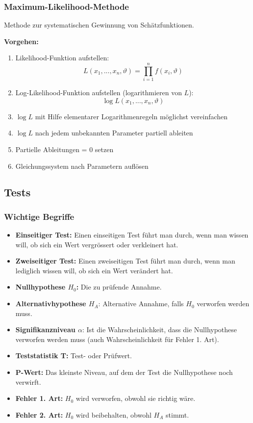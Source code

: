 \subsubsection{Maximum-Likelihood-Methode}
Methode zur systematischen Gewinnung von Schätzfunktionen.

\vspace{10pt}

\textbf{Vorgehen:}
\begin{enumerate}
	\item Likelihood-Funktion aufstellen:
	\[
	L(x_1,...,x_n,\vartheta)= \prod \limits_{i=1}^{n} f(x_i,\vartheta)
	\]
	\item Log-Likelihood-Funktion aufstellen (logarithmieren von $L$):
	\[
	\log L(x_1,...,x_n,\vartheta)
	\]
	\item $\log L$ mit Hilfe elementarer Logarithmenregeln möglichst vereinfachen
	\item $\log L$ nach jedem unbekannten Parameter partiell ableiten
	\item Partielle Ableitungen = 0 setzen
	\item Gleichungssystem nach Parametern auflösen
\end{enumerate}

\subsection{Tests}

\subsubsection{Wichtige Begriffe}

\begin{itemize}
	\item \textbf{Einseitiger Test:} Einen einseitigen Test führt man durch, wenn man wissen will, ob sich ein Wert vergrössert oder verkleinert hat.
	\item \textbf{Zweiseitiger Test:} Einen zweiseitigen Test führt man durch, wenn man lediglich wissen will, ob sich ein Wert verändert hat.
	\item \textbf{Nullhypothese $H_0$:} Die zu prüfende Annahme.
	\item \textbf{Alternativhypothese $H_A$}: Alternative Annahme, falls $H_0$ verworfen werden muss.
	\item \textbf{Signifikanzniveau $\alpha$}: Ist die Wahrscheinlichkeit, dass die Nullhypothese verworfen werden muss (auch Wahrscheinlichkeit für Fehler 1. Art).
	\item \textbf{Teststatistik T:} Test- oder Prüfwert.
	\item \textbf{P-Wert:} Das kleinste Niveau, auf dem der Test die Nullhypothese noch verwirft.
	\item \textbf{Fehler 1. Art:} $H_0$ wird verworfen, obwohl sie richtig wäre.
	\item \textbf{Fehler 2. Art:} $H_0$ wird beibehalten, obwohl $H_A$ stimmt.
\end{itemize}

